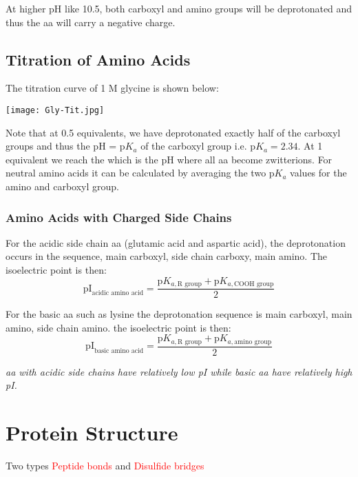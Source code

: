 \documentclass[../Bio_chemistryReview.tex]{subfiles}
\begin{document}
At higher pH like 10.5, both carboxyl and amino groups will be deprotonated and
thus the aa will carry a negative charge.

\subsection{Titration of Amino Acids\supdag}

The titration curve of 1 M glycine is shown below:

\begin{center}
  \texttt{[image: Gly-Tit.jpg]}
\end{center}

Note that at 0.5 equivalents, we have deprotonated exactly half of the carboxyl
groups and thus the pH = p$ K_{a} $ of the carboxyl group i.e. p$ K_{a}  =
2.34$. At 1 equivalent we reach the  which is the pH
where all aa become zwitterions. For neutral amino acids it can be calculated by
averaging the two p$ K_{a} $ values for the amino and carboxyl group. 

\subsubsection{Amino Acids with Charged Side Chains\supdag}

For the acidic side chain aa (glutamic acid and aspartic acid), the
deprotonation occurs in the sequence, main carboxyl, side chain carboxy, main
amino. The isoelectric point is then: \[ \text{pI}_{\text{acidic amino acid}} =
\dfrac{\text{p}K_{a,\text{R group}} + \text{p}K_{a,\text{COOH group}}}{2} \]

For the basic aa such as lysine the deprotonation sequence is main carboxyl,
main amino, side chain amino. the isoelectric point is then: \[
\text{pI}_{\text{basic amino acid}} = \dfrac{\text{p}K_{a,\text{R group}} +
\text{p}K_{a,\text{amino group}}}{2} \]

\emph{aa with acidic side chains have relatively low pI while basic aa have
relatively high pI.}

\section{Protein Structure}

Two types \textcolor{red}{Peptide bonds} and \textcolor{red}{Disulfide bridges}
\end{document}
